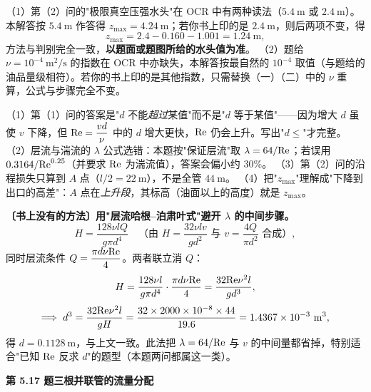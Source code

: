 \begin{tishi}
（1）第（2）问的"极限真空压强水头"在 OCR 中有两种读法（$5.4\ \mathrm{m}$ 或 $2.4\ \mathrm{m}$）。本解答按 $5.4\ \mathrm{m}$ 作答得 $z_{\max}=4.24\ \mathrm{m}$；若你书上印的是 $2.4\ \mathrm{m}$，则后两项不变，得
\[z_{\max}=2.4-0.160-1.001=1.24\ \mathrm{m},\]
方法与判别完全一致，\textbf{以题面或题图所给的水头值为准}。
（2）题给 $\nu=10^{-4}\ \mathrm{m^2/s}$ 的指数在 OCR 中亦缺失，本解答按最自然的 $10^{-4}$ 取值（与题给的油品量级相符）。若你的书上印的是其他指数，只需替换（一）（二）中的 $\nu$ 重算，公式与步骤完全不变。
\end{tishi}
\begin{yicuo}
（1）第（1）问的答案是"$d$ 不能\emph{超过}某值"而不是"$d$ 等于某值"——因为增大 $d$ 虽使 $v$ 下降，但 $\mathrm{Re}=\dfrac{vd}{\nu}$ 中的 $d$ 增大更快，$\mathrm{Re}$ 仍会上升。写出"$d\le$"才完整。
（2）层流与湍流的 $\lambda$ 公式选错：本题按"保证层流"取 $\lambda=64/\mathrm{Re}$；若误用 $0.3164/\mathrm{Re}^{0.25}$（并要求 $\mathrm{Re}$ 为湍流值），答案会偏小约 30\%。
（3）第（2）问的沿程损失只算到 $A$ 点（$l/2=22\ \mathrm{m}$），不是全管 $44\ \mathrm{m}$。
（4）把"$z_{\max}$"理解成"下降到出口的高差"：$A$ 点在\emph{上升段}，其标高（油面以上的高度）就是 $z_{\max}$。
\end{yicuo}
\begin{banfa}
\textbf{〔书上没有的方法〕用"层流哈根--泊肃叶式"避开 $\lambda$ 的中间步骤。}
\[H=\frac{128\nu lQ}{g\pi d^4}\quad\text{（由 }H=\frac{32\nu lv}{gd^2}\text{ 与 }v=\frac{4Q}{\pi d^2}\text{ 合成）},\]
同时层流条件 $Q=\dfrac{\pi d\nu\mathrm{Re}}{4}$。两者联立消 $Q$：
\[H=\frac{128\nu l}{g\pi d^4}\cdot\frac{\pi d\nu\mathrm{Re}}{4}=\frac{32\mathrm{Re}\nu^2l}{gd^3},\]
\[\Longrightarrow\;d^3=\frac{32\Rey\nu^2l}{gH}=\frac{32\times2000\times10^{-8}\times44}{19.6}=1.4367\times10^{-3}\ \mathrm{m^3},\]
得 $d=0.1128\ \mathrm{m}$，与上文一致。此法把 $\lambda=64/\mathrm{Re}$ 与 $v$ 的中间量都省掉，特别适合"已知 $\mathrm{Re}$ 反求 $d$"的题型（本题两问都属这一类）。
\end{banfa}

\noindent\textbf{第 5.17 题\quad 三根并联管的流量分配}

